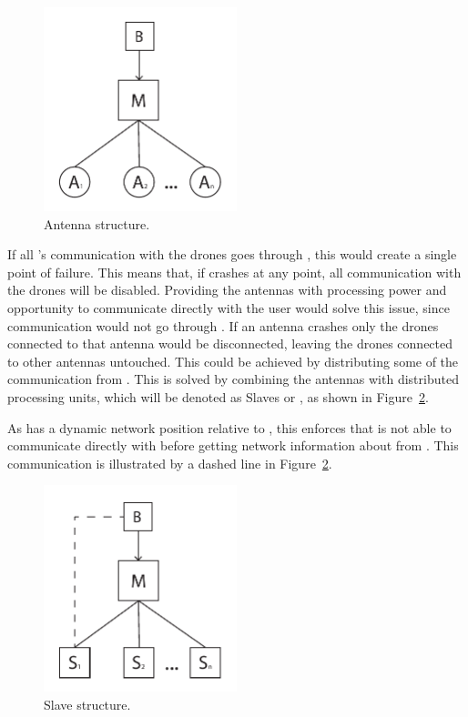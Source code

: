 \begin{figure}[htb]
    \centering
    \includegraphics[width=0.5\textwidth]{gfx/antenna_structure.pdf}
    \caption{Antenna structure.}
    \label{fig:antenna_structure}
\end{figure}

If all 's communication with the drones goes through , this would create a single point of failure.
This means that, if  crashes at any point, all communication with the drones will be disabled.
Providing the antennas with processing power and opportunity to communicate directly with the user would solve this issue, since communication would not go through .
If an antenna crashes only the drones connected to that antenna would be disconnected, leaving the drones connected to other antennas untouched.
This could be achieved by distributing some of the communication from .
This is solved by combining the antennas with distributed processing units, which will be denoted as Slaves or , as shown in Figure~\ref{fig:slave_structure}.

As  has a dynamic network position relative to , this enforces that  is not able to communicate directly with  before getting network information about  from . This communication is illustrated by a dashed line in Figure~\ref{fig:slave_structure}.

\begin{figure}[htb]
    \centering
    \includegraphics[width=0.5\textwidth]{gfx/slave_structure.pdf}
    \caption{Slave structure.}
    \label{fig:slave_structure}
\end{figure}

